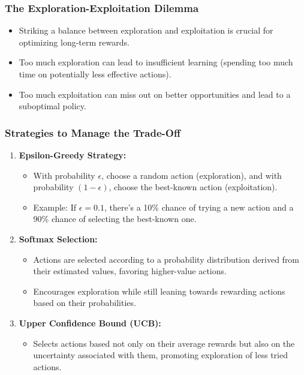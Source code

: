 \documentclass[aspectratio=169]{beamer}
\begin{document}
\begin{frame}[fragile]
    \frametitle{The Exploration-Exploitation Dilemma}
    \begin{itemize}
        \item Striking a balance between exploration and exploitation is crucial for optimizing long-term rewards.
        \item Too much exploration can lead to insufficient learning (spending too much time on potentially less effective actions).
        \item Too much exploitation can miss out on better opportunities and lead to a suboptimal policy.
    \end{itemize}
\end{frame}

\begin{frame}[fragile]
    \frametitle{Strategies to Manage the Trade-Off}
    \begin{enumerate}
        \item \textbf{Epsilon-Greedy Strategy:}
            \begin{itemize}
                \item With probability $\epsilon$, choose a random action (exploration), and with probability $(1-\epsilon)$, choose the best-known action (exploitation).
                \item Example: If $\epsilon = 0.1$, there’s a 10\% chance of trying a new action and a 90\% chance of selecting the best-known one.
            \end{itemize}
        
        \item \textbf{Softmax Selection:}
            \begin{itemize}
                \item Actions are selected according to a probability distribution derived from their estimated values, favoring higher-value actions.
                \item Encourages exploration while still leaning towards rewarding actions based on their probabilities.
            \end{itemize}
        
        \item \textbf{Upper Confidence Bound (UCB):}
            \begin{itemize}
                \item Selects actions based not only on their average rewards but also on the uncertainty associated with them, promoting exploration of less tried actions.
            \end{itemize}
    \end{enumerate}
\end{frame}
\end{document}
